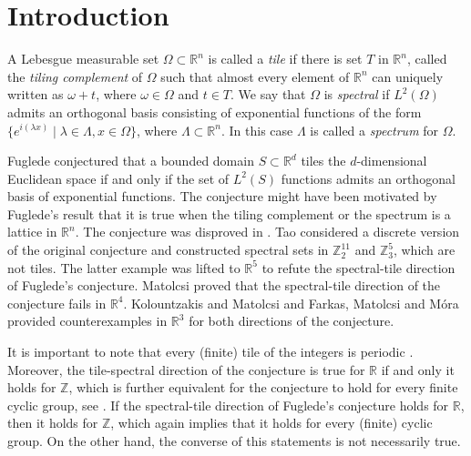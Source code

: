 \documentclass[10pt]{article}
\newcommand{\Z}{\mathbb{Z}}
\newcommand{\R}{\mathbb{R}}
\newcommand{\La}{\Lambda}
\begin{document}
        \section{Introduction}
        A Lebesgue measurable set $\Omega \subset \R^n$ is called a {\it tile} if there is set $T$ in $\R^n$, called the {\it tiling complement} of $\Omega$ such that almost every element of $\R^n$ can uniquely written as $\omega+t$, where $\omega \in \Omega $ and $t \in T$.
        We say that $\Omega$ is {\it spectral} if $L^2(\Omega)$ admits an orthogonal basis consisting of exponential functions of the form $\{ e^{i (\lambda  x)} \mid \lambda \in \Lambda, x \in \Omega \}$, where $\La \subset \R^n$. In this case $\La$ is called a {\it spectrum } for $\Omega$. 
        
        
        Fuglede conjectured \cite{F1974} that a bounded domain $S \subset \mathbb{R}^d$ tiles the $d$-dimensional Euclidean space if and only if the set of $L^2(S)$ functions admits an orthogonal basis of exponential functions. The conjecture might have been motivated by Fuglede's result \cite{F1974} that it is true when the tiling complement or the spectrum is a lattice in
        $\R^n$. The conjecture was disproved in \cite{T2004}. Tao considered a discrete version of the original conjecture and constructed spectral sets in $\Z_2^{11}$ and $\Z_3^5$, which are not tiles. The latter example was lifted to $\R^5$ to refute the spectral-tile direction of Fuglede's conjecture. 
        Matolcsi \cite{M2004} proved that the spectral-tile direction of the conjecture
        fails in $\R^4$. Kolountzakis and Matolcsi
        \cite{KMkishalmaz,KM2006a} and Farkas, Matolcsi and M\'ora \cite{FMM2006}
        provided counterexamples in $\R^3$ for both 
        directions of the conjecture. 
        
        It is important to note that every (finite) tile of the integers is periodic \cite{cm}. Moreover, the tile-spectral direction of the conjecture is true for $\R$ if and only it holds for $\Z$, which is further equivalent for the conjecture to hold for every finite cyclic group, see \cite{DL2014}. If the spectral-tile direction of Fuglede's conjecture holds for $\R$, then it holds for $\Z$, which again implies that it holds for every (finite) cyclic group. On the other hand, the converse of this statements is not necessarily true. 
        
\end{document}
